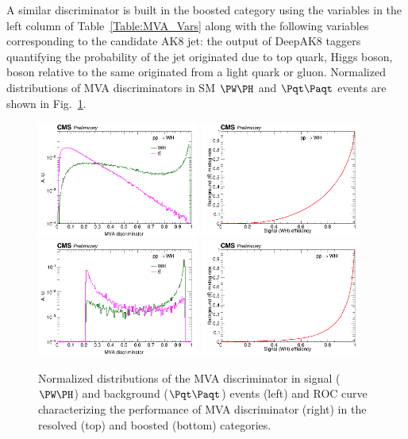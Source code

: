 \documentclass[a4paper,11pt]{article}
\newcommand{\Pt}{{{\Pqt}}\xspace}
\newcommand{\PAt}{{{{\Paqt}}}\xspace}
\begin{document}
A similar discriminator is built in the boosted category using the variables in the left column of Table~\ref{Table:MVA_Vars} along with the following variables corresponding to the \PH candidate AK8 jet: 
the output of DeepAK8 taggers quantifying the probability of the jet originated due to top quark, Higgs boson, \PW boson relative to the same originated from a light quark or gluon.
Normalized distributions of MVA discriminators in SM $\PW\PH$ and $\Pt\PAt$ events are shown in Fig.~\ref{fig:MVA}. 
\begin{figure}[hbtp]
\begin{center}
\includegraphics[width=0.475\textwidth]{Figures/RECO/Plot_WH_MVA_WH_fast_resolved.png}
\includegraphics[width=0.475\textwidth]{Figures/RECO/ROC_plot_TT_MVA_resolved.png}
\includegraphics[width=0.475\textwidth]{Figures/RECO/Plot_WH_MVA_WH_fast_boosted.png}
\includegraphics[width=0.475\textwidth]{Figures/RECO/ROC_plot_TT_MVA_boosted.png}
\end{center}
\caption{
Normalized distributions of the MVA discriminator in signal ($\PW\PH$) and background ($\Pt\PAt$) events (left) and ROC curve characterizing the performance of MVA discriminator (right) in the resolved (top) and boosted (bottom) categories.
}
\label{fig:MVA}
\end{figure}
\end{document}
